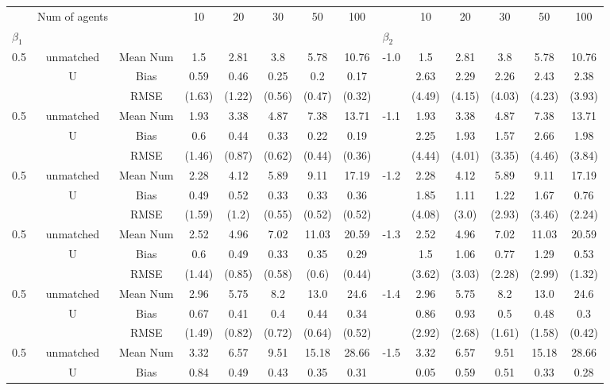 \begin{tabular}{@{\extracolsep{5pt}}lc|cccccc|lccccc}
\toprule 
 & Num of agents &  & 10 & 20 & 30 & 50 & 100 &  & 10 & 20 & 30 & 50 & 100 \\
$\beta_1$ &  &  &  &  &  &  &  & $\beta_2$ &  &  &  &  &  \\
\midrule 
0.5 & unmatched & Mean Num & 1.5 & 2.81 & 3.8 & 5.78 & 10.76 & -1.0 & 1.5 & 2.81 & 3.8 & 5.78 & 10.76 \\
 & U & Bias & 0.59 & 0.46 & 0.25 & 0.2 & 0.17 &  & 2.63 & 2.29 & 2.26 & 2.43 & 2.38 \\
 &  & RMSE & (1.63) & (1.22) & (0.56) & (0.47) & (0.32) &  & (4.49) & (4.15) & (4.03) & (4.23) & (3.93) \\
0.5 & unmatched & Mean Num & 1.93 & 3.38 & 4.87 & 7.38 & 13.71 & -1.1 & 1.93 & 3.38 & 4.87 & 7.38 & 13.71 \\
 & U & Bias & 0.6 & 0.44 & 0.33 & 0.22 & 0.19 &  & 2.25 & 1.93 & 1.57 & 2.66 & 1.98 \\
 &  & RMSE & (1.46) & (0.87) & (0.62) & (0.44) & (0.36) &  & (4.44) & (4.01) & (3.35) & (4.46) & (3.84) \\
0.5 & unmatched & Mean Num & 2.28 & 4.12 & 5.89 & 9.11 & 17.19 & -1.2 & 2.28 & 4.12 & 5.89 & 9.11 & 17.19 \\
 & U & Bias & 0.49 & 0.52 & 0.33 & 0.33 & 0.36 &  & 1.85 & 1.11 & 1.22 & 1.67 & 0.76 \\
 &  & RMSE & (1.59) & (1.2) & (0.55) & (0.52) & (0.52) &  & (4.08) & (3.0) & (2.93) & (3.46) & (2.24) \\
0.5 & unmatched & Mean Num & 2.52 & 4.96 & 7.02 & 11.03 & 20.59 & -1.3 & 2.52 & 4.96 & 7.02 & 11.03 & 20.59 \\
 & U & Bias & 0.6 & 0.49 & 0.33 & 0.35 & 0.29 &  & 1.5 & 1.06 & 0.77 & 1.29 & 0.53 \\
 &  & RMSE & (1.44) & (0.85) & (0.58) & (0.6) & (0.44) &  & (3.62) & (3.03) & (2.28) & (2.99) & (1.32) \\
0.5 & unmatched & Mean Num & 2.96 & 5.75 & 8.2 & 13.0 & 24.6 & -1.4 & 2.96 & 5.75 & 8.2 & 13.0 & 24.6 \\
 & U & Bias & 0.67 & 0.41 & 0.4 & 0.44 & 0.34 &  & 0.86 & 0.93 & 0.5 & 0.48 & 0.3 \\
 &  & RMSE & (1.49) & (0.82) & (0.72) & (0.64) & (0.52) &  & (2.92) & (2.68) & (1.61) & (1.58) & (0.42) \\
0.5 & unmatched & Mean Num & 3.32 & 6.57 & 9.51 & 15.18 & 28.66 & -1.5 & 3.32 & 6.57 & 9.51 & 15.18 & 28.66 \\
 & U & Bias & 0.84 & 0.49 & 0.43 & 0.35 & 0.31 &  & 0.05 & 0.59 & 0.51 & 0.33 & 0.28 \\

\end{tabular}
